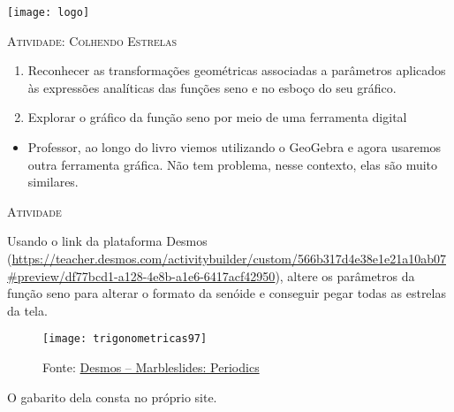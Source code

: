 \documentclass[10 pt,usenames,dvipsnames, oneside]{article}
\begin{document}
\begin{center}
  \begin{minipage}[l]{3cm}
\texttt{[image: logo]}    
\end{minipage}\hfill
\begin{minipage}[r]{.8\textwidth}
 {\Large \scshape Atividade: Colhendo Estrelas}  
\end{minipage}
\end{center}
\vspace{.2cm}

\ifdefined\prof

\begin{goals}
\begin{enumerate}
\item Reconhecer as transformações geométricas associadas a
parâmetros aplicados às expressões analíticas das funções
seno e no esboço do seu gráfico.
\item Explorar o gráfico da função seno por meio de uma
ferramenta digital
\end{enumerate}

\tcblower

\begin{itemize}
\item Professor, ao longo do livro viemos utilizando o GeoGebra e
agora usaremos outra ferramenta gráfica. Não tem problema,
nesse contexto, elas são muito similares.
\end{itemize}
\end{goals}

\bigskip
\begin{center}
{\large \scshape Atividade}
\end{center}
\fi

Usando o link da plataforma Desmos (\url{https://teacher.desmos.com/activitybuilder/custom/566b317d4e38e1e21a10ab07\#preview/df77bcd1-a128-4e8b-a1e6-6417acf42950}), altere os parâmetros da função seno para alterar o formato da senóide e conseguir pegar todas as estrelas da tela.

\begin{figure}[H]
\centering

\texttt{[image: trigonometricas97]}
\caption{Fonte: \href{https://teacher.desmos.com/activitybuilder/custom/566b317d4e38e1e21a10ab07\#preview/df77bcd1-a128-4e8b-a1e6-6417acf42950}{Desmos -- Marbleslides: Periodics}}
\label{}
\end{figure}

\ifdefined\prof
\begin{solucao}

O gabarito dela consta no próprio site.

\end{solucao}
\fi
\end{document}

